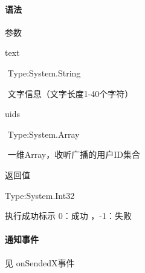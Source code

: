 \documentclass[letterpaper,10pt,english]{sphinxmanual}
\begin{document}
\paragraph{语法}
\label{\detokenize{csharp_activex:id115}}
%
\begin{sphinxVerbatim}[commandchars=\\\{\}]
     
\end{sphinxVerbatim}

参数

text

​ Type:System.String

​ 文字信息（文字长度1-40个字符）

uids

​ Type:System.Array

​ 一维Array，收听广播的用户ID集合

返回值

Type:System.Int32

执行成功标示 0：成功 ，-1：失败


\paragraph{通知事件}
\label{\detokenize{csharp_activex:id116}}
见 onSendedX事件
\end{document}
